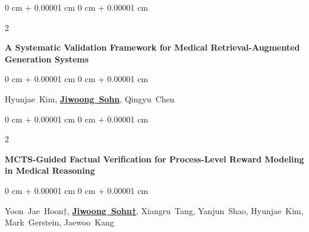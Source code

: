 \documentclass[10pt, letterpaper]{article}
\newenvironment{onecolentry}{
    \begin{adjustwidth}{
        0 cm + 0.00001 cm
    }{
        0 cm + 0.00001 cm
    }
}{
    \end{adjustwidth}
} %
\newenvironment{twocolentry}[2][]{
    \onecolentry
    \def\secondColumn{#2}
    \setcolumnwidth{\fill, 3.5 cm}
    \begin{paracol}{2}
}{
    \switchcolumn \raggedleft \secondColumn
    \end{paracol}
    \endonecolentry
} %
\begin{document}
       \begin{twocolentry}
            {
                2025
            }
            {
                \textbf{A Systematic Validation Framework for Medical Retrieval-Augmented Generation Systems}
            }
        \end{twocolentry}           
        \begin{onecolentry}
                \mbox{Hyunjae Kim}, \mbox{\textbf{\underline{Jiwoong Sohn}}}, \mbox{Qingyu Chen}
        \end{onecolentry}
    \vspace{0.3 cm}

       \begin{twocolentry}
            {
                2025
            }
            {
                \textbf{MCTS-Guided Factual Verification for Process-Level Reward Modeling in Medical Reasoning}
            }
        \end{twocolentry}           
        \begin{onecolentry}
                \mbox{Yoon Jae Hoon†}, \mbox{\textbf{\underline{Jiwoong Sohn†}}}, \mbox{Xiangru Tang}, \mbox{Yanjun Shao}, \mbox{Hyunjae Kim}, \mbox{Mark Gerstein}, \mbox{Jaewoo Kang}
        \end{onecolentry}
    \vspace{0.3 cm}

    
\end{document}
